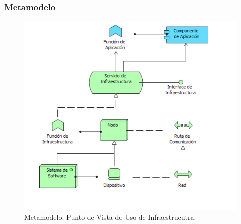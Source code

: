 \subsubsection{Metamodelo}
\begin{figure}[h]
	\centering
	\includegraphics[width=1.0\textwidth]{imagenes/Metamodelos/Tecnologia/meta_uso_infraestructura.PDF}
	\caption{Metamodelo: Punto de Vista de Uso de Infraestrucutra.}
	\label{fig:gap_analysis}
\end{figure}


